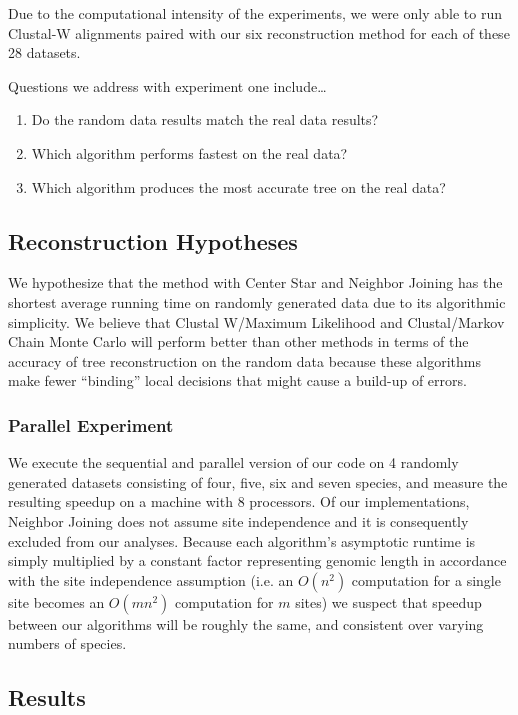 \documentclass[10pt,twocolumn]{article}
\begin{document}
Due to the computational intensity of the experiments, we were only able to run Clustal-W alignments
paired with our six reconstruction method for each of these 28 datasets.

Questions we address with experiment one include\ldots
\begin{enumerate}
  \item Do the random data results match the real data results?
  \item Which algorithm performs fastest on the real data?
  \item Which algorithm produces the most accurate tree on the real data?
\end{enumerate}

\subsection*{Reconstruction Hypotheses}
We hypothesize that the method with Center Star and Neighbor Joining has the shortest average running
time on randomly generated data due to its algorithmic simplicity. We believe that Clustal W/Maximum Likelihood
and Clustal/Markov Chain Monte Carlo will perform better than other methods in terms of the accuracy of tree reconstruction
on the random data because these algorithms make fewer ``binding'' local decisions that might cause a build-up of errors.

\subsubsection*{Parallel Experiment}

We execute the sequential and parallel version of our code on 4 randomly generated datasets consisting of four, five, six and seven species, and measure the resulting speedup
on a machine with 8 processors. Of our implementations, Neighbor Joining does not assume site independence and it is consequently excluded from
our analyses. Because each algorithm's asymptotic runtime is simply multiplied by a constant factor representing genomic length in accordance
with the site independence assumption (i.e. an $O(n^2)$ computation for a single site becomes an $O(mn^2)$ computation for $m$ sites) we suspect
that speedup between our algorithms will be roughly the same, and consistent over varying numbers of species.

\subsection*{Results}
\end{document}
